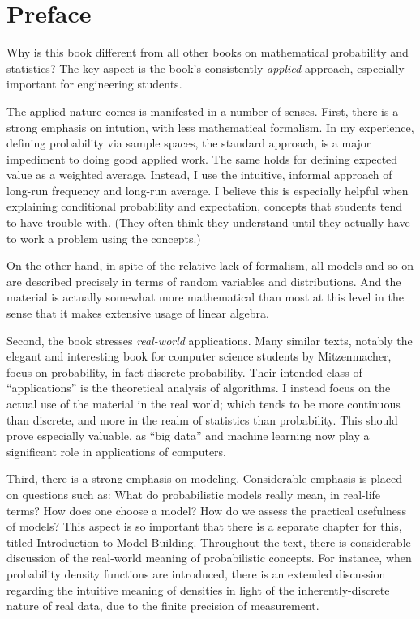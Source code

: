 \chapter*{Preface}
\label{preface}

Why is this book different from all other books on mathematical
probability and statistics?  The key aspect is the book's
consistently {\it applied} approach, especially important for
engineering students.

The applied nature comes is manifested in a number of senses.
First, there is a strong emphasis on intution, with less mathematical
formalism.  In my experience, defining probability via sample spaces,
the standard approach, is a major impediment to doing good applied work.
The same holds for defining expected value as a weighted average.
Instead, I use the intuitive, informal approach of long-run frequency
and long-run average.  I believe this is especially helpful when
explaining conditional probability and expectation, concepts that
students tend to have trouble with.  (They often think they understand
until they actually have to work a problem using the concepts.)

On the other hand, in spite of the relative lack of formalism, all
models and so on are described precisely in terms of random variables
and distributions.  And the material is actually somewhat more
mathematical than most at this level in the sense that it makes
extensive usage of linear algebra.

Second, the book stresses {\it real-world} applications.  Many similar
texts, notably the elegant and interesting book for computer science
students by Mitzenmacher, focus on probability, in fact discrete
probability.  Their intended class of ``applications'' is the
theoretical analysis of algorithms.  I instead focus on the actual use
of the material in the real world; which tends to be more continuous
than discrete, and more in the realm of statistics than probability.
This should prove especially valuable, as ``big data'' and machine
learning now play a significant role in applications of computers.

Third, there is a strong emphasis on modeling.  Considerable emphasis is
placed on questions such as: What do probabilistic models really mean,
in real-life terms?  How does one choose a model?  How do we assess the
practical usefulness of models?  This aspect is so important that there
is a separate chapter for this, titled Introduction to Model Building.
Throughout the text, there is considerable discussion of the real-world
meaning of probabilistic concepts.  For instance, when probability
density functions are introduced, there is an extended discussion
regarding the intuitive meaning of densities in light of the
inherently-discrete nature of real data, due to the finite precision of
measurement.  

